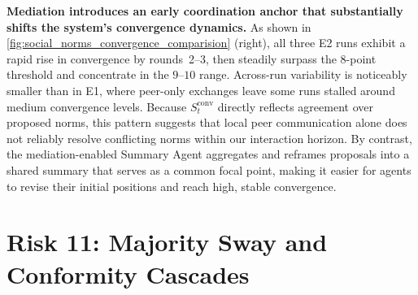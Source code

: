 \documentclass[11pt, letterpaper, shortlabels]{berkeley}
\begin{document}
{%
\textbf{Mediation introduces an early coordination anchor that substantially shifts the system’s convergence dynamics.} 
As shown in \autoref{fig:social_norms_convergence_comparision} (right), all three E2 runs exhibit a rapid rise in convergence by rounds~2--3, then steadily surpass the $8$-point threshold and concentrate in the $9$--$10$ range. 
Across-run variability is noticeably smaller than in E1, where peer-only exchanges leave some runs stalled around medium convergence levels. 
Because $S_t^{\text{conv}}$ directly reflects agreement over proposed norms, this pattern suggests that local peer communication alone does not reliably resolve conflicting norms within our interaction horizon. 
By contrast, the mediation-enabled Summary Agent aggregates and reframes proposals into a shared summary that serves as a common focal point, making it easier for agents to revise their initial positions and reach high, stable convergence.


\section{Risk 11: Majority Sway and Conformity Cascades}
\label{sec:conformity}

}
\end{document}
